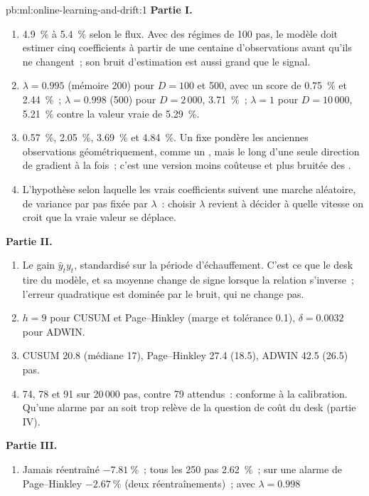 \begin{solution}{pb:ml:online-learning-and-drift:1}
\textbf{Partie I.}
\begin{enumerate}
\item 4.9~\% à 5.4~\% selon le flux. Avec des régimes de 100 pas, le modèle doit estimer cinq coefficients à partir de
une centaine d'observations avant qu'ils ne changent~; son bruit d'estimation est aussi grand que le signal.
\item $\lambda = 0.995$ (mémoire 200) pour $D = 100$ et 500, avec un score de 0.75~\% et 2.44~\%~; $\lambda = 0.998$ (500) pour
$D = 2\,000$, 3.71~\%~; $\lambda = 1$ pour $D = 10\,000$, 5.21~\% contre la valeur vraie de 5.29~\%.
\item 0.57~\%, 2.05~\%, 3.69~\% et 4.84~\%. Un  fixe pondère les anciennes observations géométriquement, comme un , mais le long d'une seule direction de gradient à la fois~; c'est une version moins coûteuse et plus bruitée des .
\item L'hypothèse selon laquelle les vrais coefficients suivent une marche aléatoire, de variance par pas fixée par $\lambda$~: choisir $\lambda$ revient à
décider à quelle vitesse on croit que la vraie valeur se déplace.
\end{enumerate}
\textbf{Partie II.}
\begin{enumerate}[resume]
\item Le gain $\hat y_ty_t$, standardisé sur la période d'échauffement. C'est ce que le desk tire du modèle, et sa moyenne change
de signe lorsque la relation s'inverse~; l'erreur quadratique est dominée par le bruit, qui ne change pas.
\item $h = 9$ pour CUSUM et Page--Hinkley (marge et tolérance 0.1), $\delta = 0.0032$ pour ADWIN.
\item CUSUM 20.8 (médiane 17), Page--Hinkley 27.4 (18.5), ADWIN 42.5 (26.5) pas.
\item 74, 78 et 91 sur 20\,000 pas, contre 79 attendus~: conforme à la calibration. Qu'une alarme par an soit trop relève
de la question de coût du desk (partie IV).
\end{enumerate}
\textbf{Partie III.}
\begin{enumerate}[resume]
\item Jamais réentraîné $-7.81~\%$~; tous les 250 pas 2.62~\%~; sur une alarme de Page--Hinkley $-2.67~\%$ (deux réentraînements)~;  avec $\lambda = 0.998$

\end{enumerate}
\end{solution}
